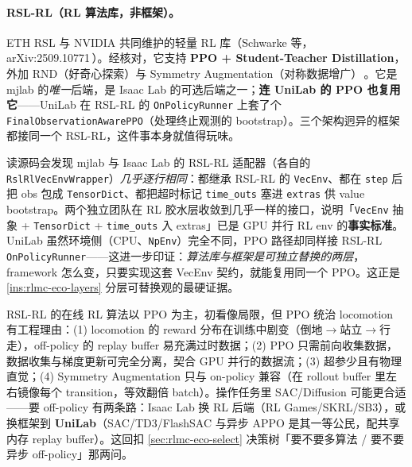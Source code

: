 \paragraph{RSL-RL（RL 算法库，非框架）。}ETH RSL 与 NVIDIA 共同维护的轻量 RL 库（Schwarke 等，arXiv:2509.10771\,\cite{schwarke2025rslrl}）。经核对，它支持 \textbf{PPO + Student-Teacher Distillation}，外加 RND（好奇心探索）与 Symmetry Augmentation（对称数据增广）\,\cite{schwarke2025rslrl}。它是 mjlab 的\emph{唯一}后端，是 Isaac Lab 的可选后端之一；\textbf{连 UniLab 的 PPO 也复用它}——UniLab 在 RSL-RL 的 \verb|OnPolicyRunner| 上套了个 \verb|FinalObservationAwarePPO|（处理终止观测的 bootstrap）。三个架构迥异的框架都接同一个 RSL-RL，这件事本身就值得玩味。

\begin{insight}\label{ins:rlmc-eco-vecenv}
读源码会发现 mjlab 与 Isaac Lab 的 RSL-RL 适配器（各自的 \verb|RslRlVecEnvWrapper|）\emph{几乎逐行相同}：都继承 RSL-RL 的 \verb|VecEnv|、都在 \verb|step| 后把 obs 包成 \verb|TensorDict|、都把超时标记 \verb|time_outs| 塞进 \verb|extras| 供 value bootstrap。两个独立团队在 RL 胶水层收敛到几乎一样的接口，说明「\verb|VecEnv| 抽象 + \verb|TensorDict| + \verb|time_outs| 入 extras」已是 GPU 并行 RL env 的\textbf{事实标准}。UniLab 虽然环境侧（CPU、\verb|NpEnv|）完全不同，PPO 路径却同样接 RSL-RL \verb|OnPolicyRunner|——这进一步印证：\emph{算法库与框架是可独立替换的两层}，framework 怎么变，只要实现这套 VecEnv 契约，就能复用同一个 PPO。这正是 \cref{ins:rlmc-eco-layers} 分层可替换观的最硬证据。
\end{insight}

\begin{insight}\label{ins:rlmc-eco-ppo}
RSL-RL 的在线 RL 算法以 PPO 为主，初看像局限，但 PPO 统治 locomotion 有工程理由：(1) locomotion 的 reward 分布在训练中剧变（倒地$\to$站立$\to$行走），off-policy 的 replay buffer 易充满过时数据；(2) PPO 只需前向收集数据，数据收集与梯度更新可完全分离，契合 GPU 并行的数据流；(3) 超参少且有物理直觉；(4) Symmetry Augmentation 只与 on-policy 兼容（在 rollout buffer 里左右镜像每个 transition，等效翻倍 batch）。操作任务里 SAC/Diffusion 可能更合适——要 off-policy 有两条路：Isaac Lab 换 RL 后端（RL Games/SKRL/SB3），或换框架到 \textbf{UniLab}（SAC/TD3/FlashSAC 与异步 APPO 是其一等公民，配共享内存 replay buffer）。这回扣 \cref{sec:rlmc-eco-select} 决策树「要不要多算法 / 要不要异步 off-policy」那两问。
\end{insight}

